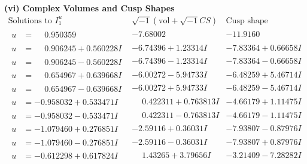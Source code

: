 \documentclass[1p]{elsarticle_modified}
\theoremstyle{definition}
\newcommand{\I}{\sqrt{-1}}
\begin{document}
\newpage\flushleft \textbf{(vi) Complex Volumes and Cusp Shapes}
$$\begin{array}{c|c|c}  
\text{Solutions to }I^u_{1}& \I (\text{vol} + \sqrt{-1}CS) & \text{Cusp shape}\\
 \hline 
\begin{aligned}
u &= \phantom{-}0.950359\phantom{ +0.000000I}\end{aligned}
 & -7.68002\phantom{ +0.000000I} & -11.9160\phantom{ +0.000000I} \\ \hline\begin{aligned}
u &= \phantom{-}0.906245 + 0.560228 I\end{aligned}
 & -6.74396 + 1.23314 I & -7.83364 + 0.66658 I \\ \hline\begin{aligned}
u &= \phantom{-}0.906245 - 0.560228 I\end{aligned}
 & -6.74396 - 1.23314 I & -7.83364 - 0.66658 I \\ \hline\begin{aligned}
u &= \phantom{-}0.654967 + 0.639668 I\end{aligned}
 & -6.00272 - 5.94733 I & -6.48259 + 5.46714 I \\ \hline\begin{aligned}
u &= \phantom{-}0.654967 - 0.639668 I\end{aligned}
 & -6.00272 + 5.94733 I & -6.48259 - 5.46714 I \\ \hline\begin{aligned}
u &= -0.958032 + 0.533471 I\end{aligned}
 & \phantom{-}0.422311 + 0.763813 I & -4.66179 + 1.11475 I \\ \hline\begin{aligned}
u &= -0.958032 - 0.533471 I\end{aligned}
 & \phantom{-}0.422311 - 0.763813 I & -4.66179 - 1.11475 I \\ \hline\begin{aligned}
u &= -1.079460 + 0.276851 I\end{aligned}
 & -2.59116 + 0.36031 I & -7.93807 - 0.87976 I \\ \hline\begin{aligned}
u &= -1.079460 - 0.276851 I\end{aligned}
 & -2.59116 - 0.36031 I & -7.93807 + 0.87976 I \\ \hline\begin{aligned}
u &= -0.612298 + 0.617824 I\end{aligned}
 & \phantom{-}1.43265 + 3.79656 I & -3.21409 - 7.28282 I \\ \hline\begin{aligned}

\end{aligned}
\end{array}$$
\end{document}
